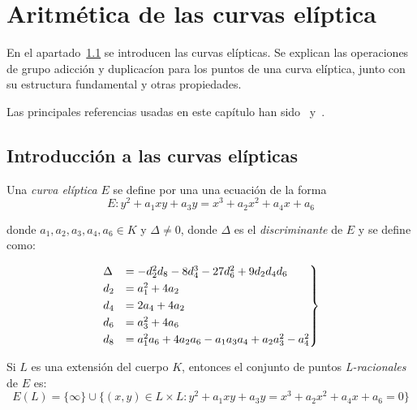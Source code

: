\chapter{Aritmética de las curvas elíptica}
\label{ch:Aritmética de las curvas elíptica}


En el apartado~\ref{sec:Introducción} se introducen las curvas elípticas. Se explican las operaciones de grupo adicción y duplicacíon para los puntos de una curva elíptica, junto con su estructura fundamental y otras propiedades.

Las principales referencias usadas en este capítulo han sido~\cite{Washington:2008} y~\cite{Hankerson:2003}.


\section{Introducción a las curvas elípticas}
\label{sec:Introducción}

\begin{definicion}
\label{def:curva elíptica}
	Una \emph{curva elíptica} $E$ se define por una una ecuación de la forma
	\begin{equation}
	\label{eq:Weierstrass general}
		E : y^2 + a_1 x y + a_3 y = x^3 + a_2 x^2 + a_4 x + a_6
	\end{equation}

	donde $a_1, a_2, a_3, a_4, a_6 \in K$ y $\Delta \neq 0$, donde $\Delta$ es el \emph{discriminante} de $E$ y se define como:

	\begin{align}
		\label{eq:discriminante}
		\begin{rcases}
		\Delta & = -d_2^2 d_8 - 8 d_4^3 - 27 d_6^2 + 9 d_2 d_4 d_6         \\
		d_2    & = a_1^2 + 4 a_ 2                                          \\
		d_4    & = 2 a_4 + 4 a_2                                           \\
		d_6    & = a_3^2 + 4 a_6                                           \\
		d_8    & = a_1^2 a_6 + 4 a_2 a_6 - a_1 a_3 a_4 + a_2 a_3^2 - a_4^2 \\
		\end{rcases}
	\end{align}

	Si $L$ es una extensión del cuerpo $K$, entonces el conjunto de puntos \emph{L-racionales} de $E$ es:
	$$
	E(L) = \{\infty\} \cup \{(x, y) \in L \times L: y^2 + a_1 x y + a_3 y = x^3 + a_2 x^2 + a_4 x + a_6 = 0\}
	$$
\end{definicion}


